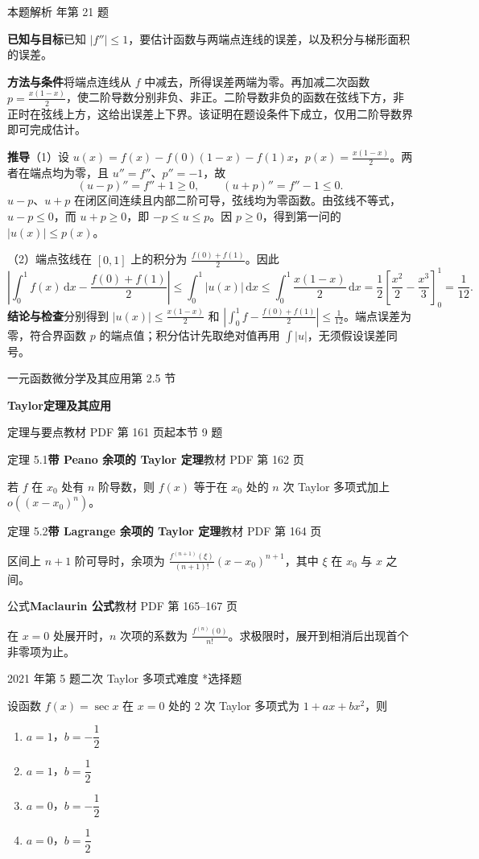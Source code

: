 \documentclass[UTF8,zihao=-4,fontset=fandol]{ctexart}
\newcommand{\SectionHeading}[4]{%
  \clearpage\hypertarget{sec-#1}{}%
  {\small\textcolor{accent}{#2\hfill 第 #1 节}}\par\medskip
  {\LARGE\bfseries #3}\par\smallskip
  {\small\textcolor{muted}{#4}}\par\bigskip}
\newcommand{\Theory}[4]{%
  {\small\textcolor{accent}{#1}\quad\textbf{#3}\hfill\textcolor{muted}{教材 PDF 第 #2 页}}\par
  {\small #4}\par\smallskip}
\newenvironment{abcd}{\begin{enumerate}[label=\textup{(\Alph*)},leftmargin=2.3em,itemsep=1pt,topsep=4pt,parsep=1pt]}{\end{enumerate}}
\newcommand{\choices}[4]{%
  \begin{abcd}
    \item #1
    \item #2
    \item #3
    \item #4
  \end{abcd}}
\newcounter{BankQuestion}
\newcommand{\QuestionPage}[7]{%
  \stepcounter{BankQuestion}%
  \par\noindent\begin{minipage}{\linewidth}
  \raggedright
  {\small\textcolor{black!60}{#3\quad #5\quad 难度 #7}\hfill\textcolor{accent}{#2}}\par\smallskip}
\newcommand{\QuestionEnd}{\end{minipage}\par\medskip}
\newcommand{\QuestionPage}[7]{%
  \clearpage
  \stepcounter{BankQuestion}%
  {\small\textcolor{accent}{#1\hfill #2}}\par\medskip
  {\small\textcolor{black!60}{#3\quad #5\quad 难度 #7\hfill \arabic{BankQuestion} / 234}}\par\vspace{9bp}}
\newcommand{\QuestionEnd}{}
\newenvironment{QuestionSolution}[1]{%
  \clearpage
  {\small\textcolor{black!60}{本题解析\quad #1}}\par\medskip
}{\par\clearpage}
\begin{document}
\begin{QuestionSolution}{2024 年第 21 题}
\textbf{已知与目标}\quad 已知 \(|f''|\le1\)，要估计函数与两端点连线的误差，以及积分与梯形面积的误差。

\textbf{方法与条件}\quad 将端点连线从 \(f\) 中减去，所得误差两端为零。再加减二次函数 \(p=\frac{x(1-x)}2\)，使二阶导数分别非负、非正。二阶导数非负的函数在弦线下方，非正时在弦线上方，这给出误差上下界。该证明在题设条件下成立，仅用二阶导数界即可完成估计。

\textbf{推导}\quad （1）设 \(u(x)=f(x)-f(0)(1-x)-f(1)x\)，\(p(x)=\frac{x(1-x)}{2}\)。两者在端点均为零，且 \(u''=f''\)、\(p''=-1\)，故
\[
(u-p)''=f''+1\ge0,\qquad
(u+p)''=f''-1\le0.
\]
\(u-p\)、\(u+p\) 在闭区间连续且内部二阶可导，弦线均为零函数。由弦线不等式，\(u-p\le0\)，而 \(u+p\ge0\)，即 \(-p\le u\le p\)。因 \(p\ge0\)，得到第一问的 \(|u(x)|\le p(x)\)。

（2）端点弦线在 \([0,1]\) 上的积分为 \(\frac{f(0)+f(1)}{2}\)。因此
\[
\left|\int_0^1 f(x)\,\mathrm{d}x-\frac{f(0)+f(1)}{2}\right|
\le\int_0^1 |u(x)|\,\mathrm{d}x
\le\int_0^1\frac{x(1-x)}{2}\,\mathrm{d}x
=\frac12\left[\frac{x^2}{2}-\frac{x^3}{3}\right]_0^1=\frac{1}{12}.
\]
\textbf{结论与检查}\quad 分别得到 \(\boxed{|u(x)|\le\frac{x(1-x)}2}\) 和 \(\boxed{\left|\int_0^1f-\frac{f(0)+f(1)}2\right|\le\frac1{12}}\)。端点误差为零，符合界函数 \(p\) 的端点值；积分估计先取绝对值再用 \(\int|u|\)，无须假设误差同号。
\end{QuestionSolution}

\SectionHeading{2.5}{一元函数微分学及其应用}{Taylor定理及其应用}{定理与要点\quad 教材 PDF 第 161 页起\hfill 本节 9 题}
\Theory{定理 5.1}{162}{带 Peano 余项的 Taylor 定理}{若 \(f\) 在 \(x_0\) 处有 \(n\) 阶导数，则 \(f(x)\) 等于在 \(x_0\) 处的 \(n\) 次 Taylor 多项式加上 \(o((x-x_0)^n)\)。}
\Theory{定理 5.2}{164}{带 Lagrange 余项的 Taylor 定理}{区间上 \(n+1\) 阶可导时，余项为 \(\frac{f^{(n+1)}(\xi)}{(n+1)!}(x-x_0)^{n+1}\)，其中 \(\xi\) 在 \(x_0\) 与 \(x\) 之间。}
\Theory{公式}{165--167}{Maclaurin 公式}{在 \(x=0\) 处展开时，\(n\) 次项的系数为 \(\frac{f^{(n)}(0)}{n!}\)。求极限时，展开到相消后出现首个非零项为止。}
\QuestionPage{2.5 Taylor定理及其应用}{选择题}{2021 年第 5 题}{1}{二次 Taylor 多项式}{098 / 234}{*}
设函数 \(f(x)=\sec x\) 在 \(x=0\) 处的 2 次 Taylor 多项式为 \(1+ax+bx^2\)，则
\choices{\(a=1\)，\(b=-\dfrac{1}{2}\)}{\(a=1\)，\(b=\dfrac{1}{2}\)}{\(a=0\)，\(b=-\dfrac{1}{2}\)}{\(a=0\)，\(b=\dfrac{1}{2}\)}
\QuestionEnd
\end{document}
